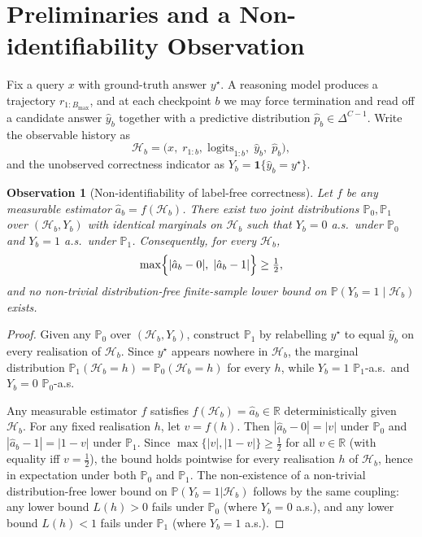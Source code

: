 \documentclass[a4paper,fleqn]{cas-sc}
\newcommand{\Hist}{\mathcal{H}}
\newcommand{\budget}{b}
\newcommand{\Bmax}{B_{\max}}
\newcommand{\Prob}{\mathbb{P}}
\newcommand{\Ind}{\mathbf{1}}
\theoremstyle{plain}
\newtheorem{observation}{Observation}
\theoremstyle{definition}
\theoremstyle{remark}
\begin{document}
\section{Preliminaries and a Non-identifiability Observation}
\label{sec:impossibility}

Fix a query $x$ with ground-truth answer $y^{\star}$. A reasoning model
produces a trajectory $r_{1:\Bmax}$, and at each checkpoint $\budget$ we may
force termination and read off a candidate answer $\hat{y}_{\budget}$ together
with a predictive distribution $\hat{p}_{\budget} \in \Delta^{C-1}$. Write the
observable history as
\begin{equation}
  \Hist_{\budget} =
  \bigl(x,\;r_{1:\budget},\;\mathrm{logits}_{1:\budget},\;
  \hat{y}_{\budget},\;\hat{p}_{\budget}\bigr),
\end{equation}
and the unobserved correctness indicator as
$Y_{\budget} = \Ind\{\hat{y}_{\budget} = y^{\star}\}$.

\begin{observation}[Non-identifiability of label-free correctness]
\label{prop:impossibility}
Let $f$ be any measurable estimator
$\hat{a}_{\budget} = f(\Hist_{\budget})$.
There exist two joint distributions $\Prob_{0},\Prob_{1}$ over
$(\Hist_{\budget},Y_{\budget})$ with identical marginals on $\Hist_{\budget}$
such that $Y_{\budget}=0$ a.s.\ under $\Prob_{0}$ and $Y_{\budget}=1$
a.s.\ under $\Prob_{1}$. Consequently, for every $\Hist_{\budget}$,
\begin{equation}
  \max\Bigl\{|\hat{a}_{\budget}-0|,\;|\hat{a}_{\budget}-1|\Bigr\}
  \geq \tfrac{1}{2},
\end{equation}
and no non-trivial distribution-free finite-sample lower bound on
$\Prob(Y_{\budget}=1\mid\Hist_{\budget})$ exists.
\end{observation}

\begin{proof}
Given any $\Prob_0$ over $(\Hist_b, Y_b)$, construct $\Prob_1$ by relabelling
$y^\star$ to equal $\hat{y}_b$ on every realisation of $\Hist_b$.
Since $y^\star$ appears nowhere in $\Hist_b$, the marginal distribution
$\Prob_1(\Hist_b=h) = \Prob_0(\Hist_b=h)$ for every $h$, while
$Y_b = 1$ $\Prob_1$-a.s.\ and $Y_b = 0$ $\Prob_0$-a.s.

Any measurable estimator $f$ satisfies $f(\Hist_b) = \hat{a}_b \in \mathbb{R}$
deterministically given $\Hist_b$.
For any fixed realisation $h$, let $v = f(h)$.
Then $|\hat{a}_b - 0| = |v|$ under $\Prob_0$ and $|\hat{a}_b - 1| = |1-v|$
under $\Prob_1$.
Since $\max\{|v|, |1-v|\} \ge \tfrac{1}{2}$ for all $v \in \mathbb{R}$
(with equality iff $v = \tfrac{1}{2}$), the bound holds pointwise for every
realisation $h$ of $\Hist_b$, hence in expectation under both $\Prob_0$ and
$\Prob_1$.
The non-existence of a non-trivial distribution-free lower bound on
$\Prob(Y_b=1|\Hist_b)$ follows by the same coupling:
any lower bound $L(h) > 0$ fails under $\Prob_0$ (where $Y_b = 0$ a.s.),
and any lower bound $L(h) < 1$ fails under $\Prob_1$ (where $Y_b = 1$ a.s.).
\end{proof}
\end{document}
